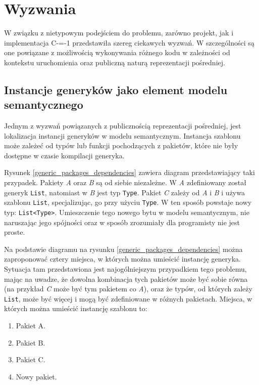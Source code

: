 \section{Wyzwania}

W związku z nietypowym podejściem do problemu, zarówno projekt, jak i implementacja C-=-1 przedstawiła szereg ciekawych wyzwań.
W szczególności są one powiązane z możliwością wykonywania różnego kodu w zależności od kontekstu uruchomienia oraz publiczną naturą reprezentacji pośredniej.

\subsection{Instancje generyków jako element modelu semantycznego}
\label{challenges:generic_instance_placement}
Jednym z wyzwań powiązanych z publicznością reprezentacji pośredniej, jest lokalizacja instancji generyków w modelu semantycznym.
Instancja szablonu może zależeć od typów lub funkcji pochodzących z pakietów, które nie były dostępne w czasie kompilacji generyka.

Rysunek \ref{generic_packages_dependencies} zawiera diagram przedstawiający taki przypadek.
Pakiety \emph{A} oraz \emph{B} są od siebie niezależne.
W \emph{A} zdefiniowany został generyk \lstinline{List}, natomiast w \emph{B} jest typ \lstinline{Type}.
Pakiet \emph{C} zależy od \emph{A} i \emph{B} i używa szablonu \lstinline{List}, specjalizując, go przy użyciu \lstinline{Type}.
W ten sposób powstaje nowy typ: \lstinline{List<Type>}.
Umieszczenie tego nowego bytu w modelu semantycznym, nie naruszając jego spójności oraz w sposób zrozumiały dla programisty nie jest proste.

Na podstawie diagramu na rysunku \ref{generic_packages_dependencies} można zaproponować cztery miejsca, w których można umieścić instancję generyka.
Sytuacja tam przedstawiona jest najogólniejszym przypadkiem tego problemu, mając na uwadze, że dowolna kombinacja tych pakietów może być sobie równa (na przykład \emph{C} może być tym pakietem co \emph{A}), oraz że typów, od których zależy \lstinline{List}, może być więcej i mogą być zdefiniowane w różnych pakietach.
Miejsca, w których można umieścić instancję szablonu to: \begin{enumerate}
	\item \label{generic_location:A} Pakiet A.
	\item \label{generic_location:B} Pakiet B.
	\item \label{generic_location:C} Pakiet C.
	\item \label{generic_location:new} Nowy pakiet.
\end{enumerate}

